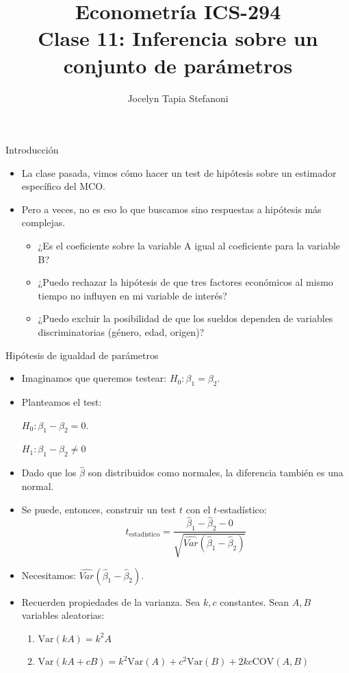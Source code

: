 \documentclass{beamer}
\title[ICS-162]{Econometría ICS-294\\ \small{Clase 11: Inferencia sobre un conjunto de parámetros}}
\author{Jocelyn Tapia Stefanoni}
\institute[USM]
{Universidad Técnica Federico Santa María\\ %
	\medskip
	\textit{} %
	
}
\date{}
\begin{document}
	
\begin{frame}
	\titlepage %


\end{frame}
\logo{}

\begin{frame}{Introducción}
    \begin{itemize}
        \item La clase pasada, vimos cómo hacer un test de hipótesis sobre un estimador específico del MCO.
        \item Pero a veces, no es eso lo que buscamos sino respuestas a hipótesis más complejas.
            \begin{itemize}
                \item ¿Es el coeficiente sobre la variable A igual al coeficiente para la variable B?
                \item ¿Puedo rechazar la hipótesis de que tres factores económicos al mismo tiempo no influyen en mi variable de interés?
                \item ¿Puedo excluir la posibilidad de que los sueldos dependen de variables discriminatorias (género, edad, origen)?
            \end{itemize}
      
    \end{itemize}
\end{frame}

\begin{frame}{Hipótesis de igualdad de parámetros}
    \begin{itemize}
        \item Imaginamos que queremos testear: $H_0: \beta_1 = \beta_2$. 
        \item Planteamos el test:
        
        $H_0: \beta_1 - \beta_2 = 0$.

        $H_1: \beta_1 - \beta_2 \neq 0$
        \item Dado que los $\hat{\beta}$ son distribuidos como normales, la diferencia también es una normal.
        \item Se puede, entonces, construir un test $t$ con el $t$-estadístico:
        \[t_{\text{estadístico}} = \frac{\hat{\beta}_1 - \hat{\beta}_2 - 0}{\sqrt{\hat{Var}(\hat{\beta}_1 - \hat{\beta}_2)}}\]
        \item Necesitamos: $\hat{Var}(\hat{\beta}_1 - \hat{\beta}_2)$.
        \item Recuerden propiedades de la varianza. Sea $k,c$ constantes. Sean $A, B$ variables aleatorias:
        \begin{enumerate}
            \item $\text{Var}(kA) = k^2A$
            \item $\text{Var}(kA + cB) = k^2\text{Var}(A) + c^2\text{Var}(B) + 2kc\text{COV}(A, B)$
        \end{enumerate}
    \end{itemize}
\end{frame}
\end{document}
